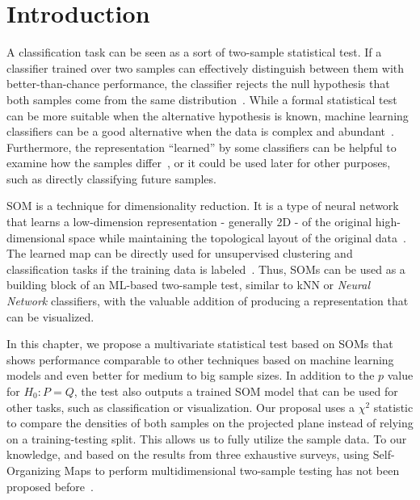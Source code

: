 \section{Introduction}

A classification task can be seen as a sort of two-sample statistical test.
If a classifier trained over two samples can effectively distinguish between
them with better-than-chance performance, the classifier rejects the null
hypothesis that both samples come from the same distribution~\cite{friedman2004multivariate}.
While a formal statistical test can be more suitable when the alternative
hypothesis is known, machine learning classifiers can be a good alternative
when the data is complex and abundant~\cite{kirchler2020two,kim2021classification,pmlr-v119-liu20m}.
Furthermore, the representation ``learned'' by some classifiers can be helpful
to examine how the samples differ~\cite{friedman2004multivariate,lopez2016revisiting},
or it could be used later for other purposes, such as directly classifying future samples.


\gls{SOM} is a technique for dimensionality
reduction. It is a type of neural network that learns a low-dimension representation
- generally 2D - of the original high-dimensional space while maintaining the topological
layout of the original data~\cite{kohonen1982self, Villmann1999}.
The learned map can be directly used for unsupervised clustering
and classification tasks if the training data is labeled~\cite{ultsch2005esom,ultsch2007emergence}.
Thus, \glspl{SOM} can be used as a building block of an ML-based two-sample test, similar to
\gls{kNN} or \emph{Neural Network} classifiers, with the valuable addition
of producing a representation that can be visualized.

In this chapter, we propose a multivariate statistical test based on
\glspl{SOM} that shows performance comparable to other techniques based on 
machine learning models and even better for medium to big sample sizes.
In addition to the 
$p$ value for $H_0: P = Q$, the test also outputs a trained \gls{SOM} model that can be used for other tasks, such as classification or visualization.
Our proposal uses a $\chi^2$ statistic to compare the densities of both samples on
the projected plane instead of relying on a training-testing split. This allows us to fully
utilize the sample data. To our knowledge, and based on the results from three
exhaustive surveys, using Self-Organizing Maps
to perform multidimensional two-sample testing has not been proposed
before~\cite{kaski1998bibliography,Oja2003,Polla2006}.

